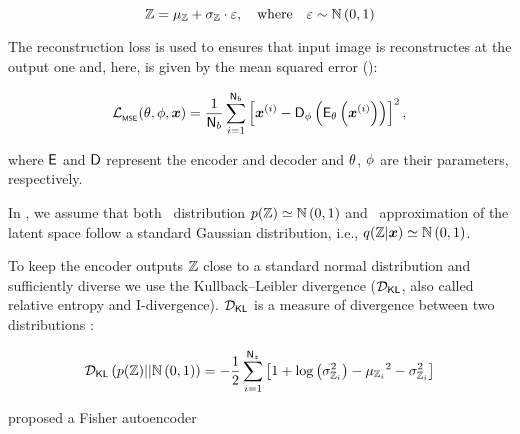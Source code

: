 \begin{figure}[H]
 \centering
 
\end{figure}

\begin{equation}
 \mathbb{Z} = {\mu_{\mathbb{Z}}} + {\sigma_{\mathbb{Z}}} \cdot \varepsilon, \quad \mbox{where} \quad \varepsilon \sim \mathbb{N}\left(0,1\right)
\end{equation}

The reconstruction loss is used to ensures that input image is reconstructes at the output one and, here, is given by the mean squared error (\MSE):

\begin{equation}
 \mathcal{L}_{_{\mathsf{MSE}}}(\theta, \phi, \boldsymbol{x}) = \dfrac{1}{\mathsf{N}_{b}}\displaystyle \sum_{i=1}^{\mathsf{N}_{b}}\left[\boldsymbol{x}^{(i)} - \mathsf{D}_{\phi} \left( \mathsf{E}_{\theta} \left( \boldsymbol{x}^{(i)} \right) \right) \right]^2,
\end{equation}

\noindent where $\mathsf{E}$ and $\mathsf{D}$ represent the encoder and decoder and $\theta$, $\phi$ are their parameters, respectively.


In \VAE, we assume that both \prior\ distribution $p(\mathbb{Z})\simeq\mathbb{N}\left(0,1\right)$ and \posterior\ approximation of the latent space follow a standard Gaussian distribution, i.e., $q(\mathbb{Z}|\boldsymbol{x})\simeq\mathbb{N}\left(0,1\right)$.

To keep the encoder outputs $\mathbb{Z}$ close to a standard normal distribution and sufficiently diverse we use the Kullback–Leibler divergence ($\mathcal{D_{\mathsf{KL}}}$, also called relative entropy and I-divergence).
$\mathcal{D_{\mathsf{KL}}}$ is a measure of divergence between two distributions \citep{KLD1951,csiszar1975}:

\begin{equation}
 \mathcal{D_{\mathsf{KL}}}\left(p(\mathbb{Z}) || {\mathbb{N}\left(0,1\right)} \right) = -\dfrac{1}{2} \displaystyle\sum_{i=1}^{\mathsf{N}_{z}} \left[1 + \log\left({{\sigma_{\mathbb{Z}_{i}}^{2}}}\right) -  {\mu_{\mathbb{Z}_{i}}}^2 - {\sigma_{\mathbb{Z}_{i}}^{2}} \right]
\end{equation}

\cite{Zheng2019} proposed a Fisher autoencoder
